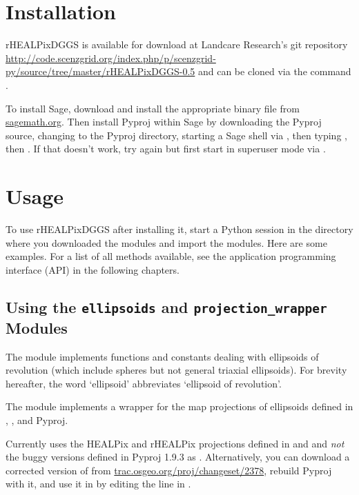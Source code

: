 \documentclass[a4paper,12ptopenany,oneside]{sphinxmanual}
\begin{document}
\section{Installation}
\label{introduction:installation}
rHEALPixDGGS is available for download at Landcare Research's git repository \href{http://code.scenzgrid.org/index.php/p/scenzgrid-py/source/tree/master/rHEALPixDGGS-0.5}{http://code.scenzgrid.org/index.php/p/scenzgrid-py/source/tree/master/rHEALPixDGGS-0.5} and can be cloned via the command .

To install Sage, download and install the appropriate binary file from \href{http://www.sagemath.org}{sagemath.org}.
Then install Pyproj within Sage by downloading the Pyproj source, changing to the Pyproj directory, starting a Sage shell via , then typing , then .
If that doesn't work, try again but first start in superuser mode via .


\section{Usage}
\label{introduction:usage}
To use rHEALPixDGGS after installing it, start a Python session in the directory where you downloaded the modules and import the modules.
Here are some examples.
For a list of all methods available, see the application programming interface (API) in the following chapters.


\subsection{Using the \texttt{ellipsoids} and \texttt{projection\_wrapper} Modules}
\label{introduction:using-the-ellipsoids-and-projection-wrapper-modules}
The  module implements functions and constants dealing with ellipsoids of revolution (which include spheres but not general triaxial ellipsoids).
For brevity hereafter, the word `ellipsoid' abbreviates `ellipsoid of revolution'.

The module  implements a wrapper for the map projections of ellipsoids defined in , , and Pyproj.

Currently  uses the HEALPix and rHEALPix projections
defined in  and  and \emph{not} the buggy versions  defined in Pyproj 1.9.3 as .
Alternatively, you can download a corrected version of  from
\href{http://trac.osgeo.org/proj/changeset/2378}{trac.osgeo.org/proj/changeset/2378}, rebuild Pyproj with it, and use it in  by editing the  line in .
\end{document}
